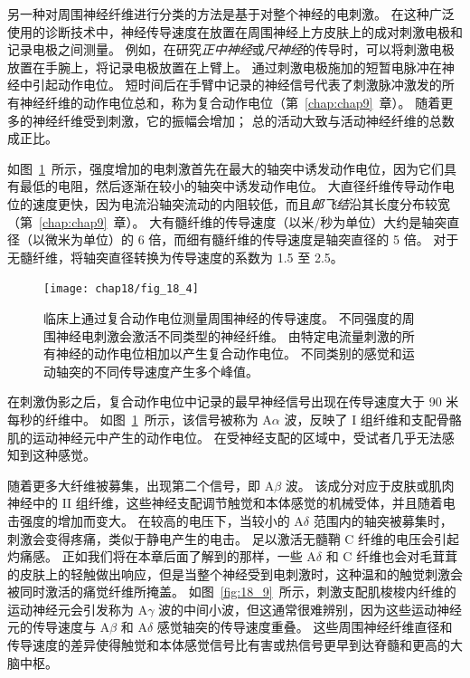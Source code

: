 另一种对周围神经纤维进行分类的方法是基于对整个神经的电刺激。
在这种广泛使用的诊断技术中，神经传导速度在放置在周围神经上方皮肤上的成对刺激电极和记录电极之间测量。
例如，在研究\textit{正中神经}或\textit{尺神经}的传导时，可以将刺激电极放置在手腕上，将记录电极放置在上臂上。
通过刺激电极施加的短暂电脉冲在神经中引起动作电位。
短时间后在手臂中记录的神经信号代表了刺激脉冲激发的所有神经纤维的动作电位总和，称为复合动作电位（第~\ref{chap:chap9}~章）。
随着更多的神经纤维受到刺激，它的振幅会增加；
总的活动大致与活动神经纤维的总数成正比。


如图~\ref{fig:18_4}~所示，强度增加的电刺激首先在最大的轴突中诱发动作电位，因为它们具有最低的电阻，然后逐渐在较小的轴突中诱发动作电位。
大直径纤维传导动作电位的速度更快，因为电流沿轴突流动的内阻较低，而且\textit{郎飞结}沿其长度分布较宽（第~\ref{chap:chap9}~章）。
大有髓纤维的传导速度（以米/秒为单位）大约是轴突直径（以微米为单位）的 6 倍，而细有髓纤维的传导速度是轴突直径的 5 倍。
对于无髓纤维，将轴突直径转换为传导速度的系数为 1.5 至 2.5。


\begin{figure}[htbp]
	\centering
	\texttt{[image: chap18/fig\_18\_4]}
	\caption{临床上通过复合动作电位测量周围神经的传导速度。
		不同强度的周围神经电刺激会激活不同类型的神经纤维。
		由特定电流量刺激的所有神经的动作电位相加以产生复合动作电位。
		不同类别的感觉和运动轴突的不同传导速度产生多个峰值\cite{erlanger2016electrical}。}
	\label{fig:18_4}
\end{figure}


在刺激伪影之后，复合动作电位中记录的最早神经信号出现在传导速度大于 90 米每秒的纤维中。
如图~\ref{fig:18_4}~所示，该信号被称为 A$\alpha$ 波，反映了 I 组纤维和支配骨骼肌的运动神经元中产生的动作电位。
在受神经支配的区域中，受试者几乎无法感知到这种感觉。


随着更多大纤维被募集，出现第二个信号，即 A$\beta$ 波。
该成分对应于皮肤或肌肉神经中的 II 组纤维，这些神经支配调节触觉和本体感觉的机械受体，并且随着电击强度的增加而变大。
在较高的电压下，当较小的 A$\delta$ 范围内的轴突被募集时，刺激会变得疼痛，类似于静电产生的电击。
足以激活无髓鞘 C 纤维的电压会引起灼痛感。
正如我们将在本章后面了解到的那样，一些 A$\delta$ 和 C 纤维也会对毛茸茸的皮肤上的轻触做出响应，但是当整个神经受到电刺激时，这种温和的触觉刺激会被同时激活的痛觉纤维所掩盖。
如图~\ref{fig:18_9}~所示，刺激支配肌梭梭内纤维的运动神经元会引发称为 A$\gamma$ 波的中间小波，但这通常很难辨别，因为这些运动神经元的传导速度与 A$\beta$ 和 A$\delta$ 感觉轴突的传导速度重叠。
这些周围神经纤维直径和传导速度的差异使得触觉和本体感觉信号比有害或热信号更早到达脊髓和更高的大脑中枢。


